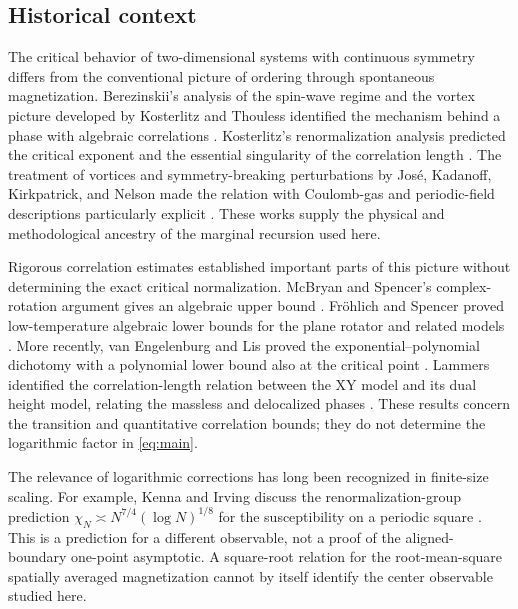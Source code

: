 \subsection{Historical context}

The critical behavior of two-dimensional systems with continuous
symmetry differs from the conventional picture of ordering through
spontaneous magnetization. Berezinskii's analysis of the spin-wave
regime and the vortex picture developed by Kosterlitz and Thouless
identified the mechanism behind a phase with algebraic correlations
\cite{Berezinskii1971,KosterlitzThouless1973}. Kosterlitz's
renormalization analysis predicted the critical exponent and the
essential singularity of the correlation length \cite{Kosterlitz1974}.
The treatment of vortices and symmetry-breaking perturbations by
Jos\'e, Kadanoff, Kirkpatrick, and Nelson made the relation with
Coulomb-gas and periodic-field descriptions particularly explicit
\cite{JoseEtAl1977}. These works supply the physical and methodological
ancestry of the marginal recursion used here.

Rigorous correlation estimates established important parts of this
picture without determining the exact critical normalization.
McBryan and Spencer's complex-rotation argument gives an algebraic
upper bound \cite{McBryanSpencer1977}. Fr\"ohlich and Spencer proved
low-temperature algebraic lower bounds for the plane rotator and
related models \cite[Theorem C]{FrohlichSpencer1981}. More recently,
van Engelenburg and Lis proved the exponential--polynomial dichotomy
with a polynomial lower bound also at the critical point
\cite[Theorem 1]{VanEngelenburgLis2023}. Lammers identified the
correlation-length relation between the XY model and its dual height
model, relating the massless and delocalized phases
\cite[Theorem 1]{Lammers2023}. These results concern the transition
and quantitative correlation bounds; they do not determine the
logarithmic factor in \eqref{eq:main}.

The relevance of logarithmic corrections has long been recognized in
finite-size scaling. For example, Kenna and Irving discuss the
renormalization-group prediction
\(\chi_N\asymp N^{7/4}(\log N)^{1/8}\) for the susceptibility on a
periodic square \cite{KennaIrving1995}. This is a prediction for a
different observable, not a proof of the aligned-boundary one-point
asymptotic. A square-root relation for the root-mean-square spatially
averaged magnetization cannot by itself identify the center observable
studied here.

